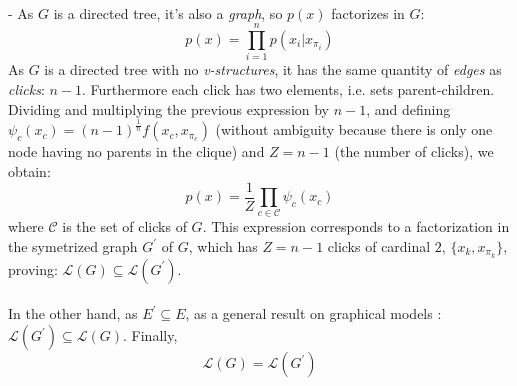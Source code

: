 \documentclass[12pt]{article}
\begin{document}
~\\
- As $G$ is a directed tree, it's also a \emph{graph}, so $p(x)$ factorizes in $G$:
$$p(x) = \prod^n_{i=1}p(x_i|x_{\pi_i})$$
As $G$ is a directed tree with no \emph{v-structures}, it has the same quantity of \emph{edges} as \emph{clicks}: $n-1$. Furthermore each click has two elements, i.e. sets parent-children. Dividing and multiplying the previous expression by $n-1$, and defining $\psi_{c}(x_{c}) = (n-1)^{\frac{1}{n}}f(x_c,x_{\pi_c})$ (without ambiguity because there is only one node having no parents in the clique) and $Z=n-1$ (the number of clicks), we obtain:
$$p(x) = \frac{1}{Z}\prod_{c\in \mathcal{C}}\psi_c(x_c)$$
where $\mathcal{C}$ is the set of clicks of $G$. This expression corresponds to a factorization in the symetrized graph $G^\prime$ of $G$, which has $Z=n-1$ clicks of cardinal $2$, $\{x_k, x_{\pi_k}\}$, proving: $\mathcal{L}(G)\subseteq \mathcal{L}(G^\prime)$.
~\\
~\\
In the other hand, as $E^\prime \subseteq E$, as a general result on graphical models : $\mathcal{L}(G^\prime)\subseteq \mathcal{L}(G)$.
Finally, $$\boxed{\mathcal{L}(G) = \mathcal{L}(G^\prime)}$$
\end{document}
